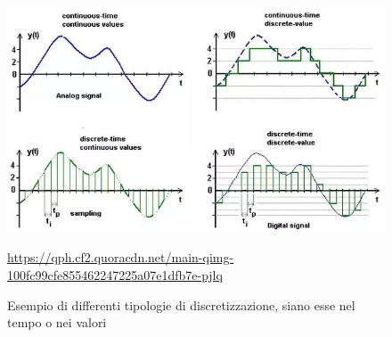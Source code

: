 \begin{figure}[H]
    \begin{center}
        \includegraphics[scale=0.5]{img/main-qimg-100fc99cfe855462247225a07e1dfb7e-pjlq.jpg}
        \caption{Esempio di differenti tipologie di discretizzazione, siano esse nel tempo o nei valori}
        \url{https://qph.cf2.quoracdn.net/main-qimg-100fc99cfe855462247225a07e1dfb7e-pjlq}
        \label{fig:discretization}
    \end{center}
\end{figure}
